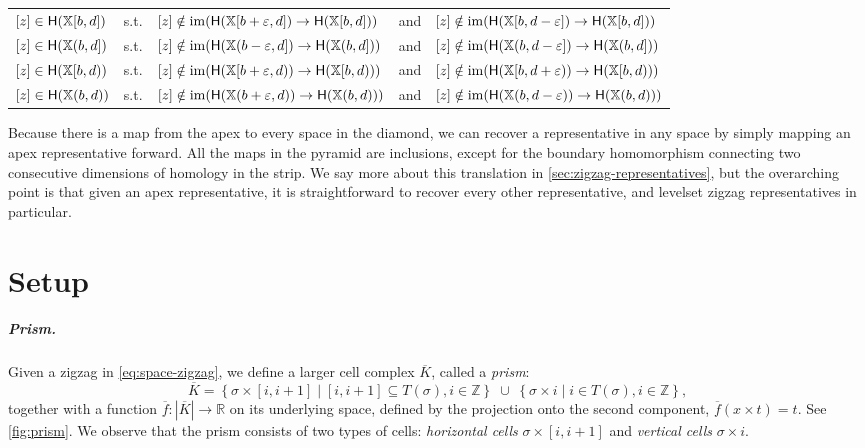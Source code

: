 \documentclass[cleveref,a4paper,english,nolineno]{socg-lipics-v2021}
\newcommand{\Rsp}{\mathbb{R}}
\newcommand{\Xsp}{\mathbb{X}}
\newcommand{\Zsp}{\mathbb{Z}}
\renewcommand{\paragraph}[1]{\subparagraph*{#1}}
\newcommand{\im}{\operatorname{im}}
\newcommand{\Hgr}{{\sf H}}
\newcommand{\prism}[1]{\overline{#1}}
\newcommand{\pK}{\prism{K}}
\newcommand{\pf}{\prism{f}}
\newcommand{\ssx}{\sigma}
\newcommand{\ee}{\varepsilon}
\begin{document}
\vspace{1ex}
\hspace{-5.5ex}
\begin{tabular}{l@{~}c@{~}l@{~}c@{~}l}
        $[z] \in \Hgr(\Xsp[b,d])$
         & s.t. &
        $[z] \notin \im (\Hgr(\Xsp[b+\ee,d]) \to \Hgr(\Xsp[b,d]))$
         & and &
        $[z] \notin \im (\Hgr(\Xsp[b,d-\ee]) \to \Hgr(\Xsp[b,d]))$ \\
        $[z] \in \Hgr(\Xsp(b,d])$
         & s.t. &
        $[z] \notin \im (\Hgr(\Xsp(b-\ee,d]) \to \Hgr(\Xsp(b,d]))$
         & and &
        $[z] \notin \im (\Hgr(\Xsp(b,d-\ee]) \to \Hgr(\Xsp(b,d]))$ \\
        $[z] \in \Hgr(\Xsp[b,d))$
         & s.t. &
        $[z] \notin \im (\Hgr(\Xsp[b+\ee,d)) \to \Hgr(\Xsp[b,d)))$
         & and &
        $[z] \notin \im (\Hgr(\Xsp[b,d+\ee)) \to \Hgr(\Xsp[b,d)))$ \\
        $[z] \in \Hgr(\Xsp(b,d))$
         & s.t. &
        $[z] \notin \im (\Hgr(\Xsp(b+\ee,d)) \to \Hgr(\Xsp(b,d)))$
         & and &
        $[z] \notin \im (\Hgr(\Xsp(b,d-\ee)) \to \Hgr(\Xsp(b,d)))$
\end{tabular}
\vspace{1ex}

Because
there is a map from the apex to every space in the diamond, we
can recover a representative in any space by simply mapping an apex
representative forward. All the maps in the pyramid are inclusions, except for
the boundary homomorphism connecting two consecutive dimensions of homology in
the strip. We say more about this translation in \cref{sec:zigzag-representatives}, but the
overarching point is that given an apex representative, it is straightforward to
recover every other representative, and levelset zigzag representatives in
particular.


\section{Setup}
\label{sec:setup}

\paragraph{Prism.}
Given a zigzag in \cref{eq:space-zigzag},
we define a larger cell complex $\pK$, called a \emph{prism}:
\begin{equation}
    \label{eq:prism}
    \pK = \left\{ \ssx \times [i,i+1] \mid [i,i+1] \subseteq T(\ssx), i \in \Zsp \right\}
                \; \cup \;
          \left\{ \ssx \times i \mid i \in T(\ssx), i \in \Zsp \right\},
\end{equation}
together with a function $\pf: |\pK| \to \Rsp$ on its underlying space,
defined by the projection onto the second component, $\pf(x \times t) = t$.
See \cref{fig:prism}.
We observe that the prism consists of two types of cells:
\emph{horizontal cells} $\ssx \times [i, i+1]$ and \emph{vertical cells} $\ssx \times i$.
\end{document}
